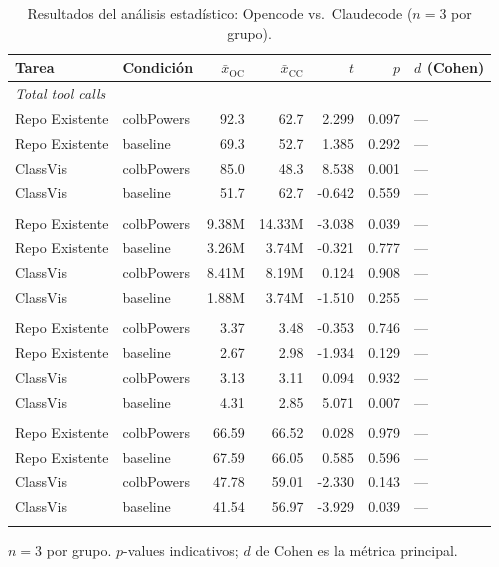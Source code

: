 \begin{table}[ht]
  \centering
  \caption{Resultados del análisis estadístico: Opencode vs.\ Claudecode ($n=3$ por grupo).}
  \label{tab:ttest_occc}
  \begin{tabular}{llrrrrl}
    \toprule
    Tarea & Condición & $\bar{x}_\text{OC}$ & $\bar{x}_\text{CC}$ & $t$ & $p$ & $d$ (Cohen) \\
    \midrule
    \multicolumn{7}{l}{\textit{Total tool calls}} \\
    \quad Repo Existente & colbPowers & 92.3 & 62.7 & 2.299 & 0.097 & — \\
    \quad Repo Existente & baseline & 69.3 & 52.7 & 1.385 & 0.292 & — \\
    \quad ClassVis & colbPowers & 85.0 & 48.3 & 8.538 & 0.001 & — \\
    \quad ClassVis & baseline & 51.7 & 62.7 & -0.642 & 0.559 & — \\
    \addlinespace
    \multicolumn{7}{l}{\textit{Total tokens}} \\
    \quad Repo Existente & colbPowers & 9.38M & 14.33M & -3.038 & 0.039 & — \\
    \quad Repo Existente & baseline & 3.26M & 3.74M & -0.321 & 0.777 & — \\
    \quad ClassVis & colbPowers & 8.41M & 8.19M & 0.124 & 0.908 & — \\
    \quad ClassVis & baseline & 1.88M & 3.74M & -1.510 & 0.255 & — \\
    \addlinespace
    \multicolumn{7}{l}{\textit{Avg. cyclomatic complexity}} \\
    \quad Repo Existente & colbPowers & 3.37 & 3.48 & -0.353 & 0.746 & — \\
    \quad Repo Existente & baseline & 2.67 & 2.98 & -1.934 & 0.129 & — \\
    \quad ClassVis & colbPowers & 3.13 & 3.11 & 0.094 & 0.932 & — \\
    \quad ClassVis & baseline & 4.31 & 2.85 & 5.071 & 0.007 & — \\
    \addlinespace
    \multicolumn{7}{l}{\textit{Maintainability index}} \\
    \quad Repo Existente & colbPowers & 66.59 & 66.52 & 0.028 & 0.979 & — \\
    \quad Repo Existente & baseline & 67.59 & 66.05 & 0.585 & 0.596 & — \\
    \quad ClassVis & colbPowers & 47.78 & 59.01 & -2.330 & 0.143 & — \\
    \quad ClassVis & baseline & 41.54 & 56.97 & -3.929 & 0.039 & — \\
    \addlinespace
    \bottomrule
  \end{tabular}
  \begin{tablenotes}
    \small \item $n=3$ por grupo. $p$-values indicativos; $d$ de Cohen es la métrica principal.
  \end{tablenotes}
\end{table}